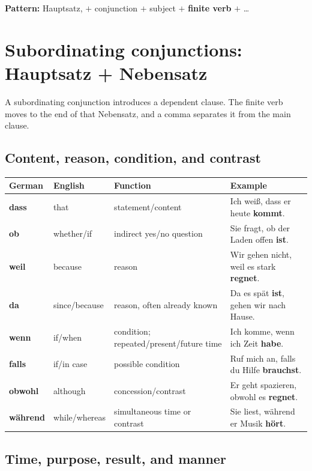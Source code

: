\noindent
\textbf{Pattern:}
\quad Hauptsatz, $+$ conjunction $+$ subject $+$ \textbf{finite verb} $+$ \ldots

\section{Subordinating conjunctions: Hauptsatz + Nebensatz}

A subordinating conjunction introduces a dependent clause. The finite verb
moves to the end of that Nebensatz, and a comma separates it from the main
clause.

\subsection{Content, reason, condition, and contrast}

\begin{center}
\small
{}
\begin{tabularx}{\textwidth}{@{}>{\bfseries}l l l X@{}}
\toprule
German & English & Function & Example \\
\midrule
dass & that & statement/content & Ich weiß, dass er heute \textbf{kommt}. \\
ob & whether/if & indirect yes/no question & Sie fragt, ob der Laden offen \textbf{ist}. \\
weil & because & reason & Wir gehen nicht, weil es stark \textbf{regnet}. \\
da & since/because & reason, often already known & Da es spät \textbf{ist}, gehen wir nach Hause. \\
wenn & if/when & condition; repeated/present/future time & Ich komme, wenn ich Zeit \textbf{habe}. \\
falls & if/in case & possible condition & Ruf mich an, falls du Hilfe \textbf{brauchst}. \\
obwohl & although & concession/contrast & Er geht spazieren, obwohl es \textbf{regnet}. \\
während & while/whereas & simultaneous time or contrast & Sie liest, während er Musik \textbf{hört}. \\
\bottomrule
\end{tabularx}
\end{center}

\subsection{Time, purpose, result, and manner}

